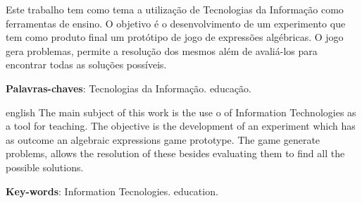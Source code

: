 
\setlength{\absparsep}{18pt} %
\begin{resumo}
 Este trabalho tem como tema a utilização de Tecnologias da Informação como ferramentas de ensino. O objetivo é o desenvolvimento de um  experimento que tem como produto final um protótipo de jogo de expressões algébricas. O jogo gera problemas, permite a resolução dos mesmos além de avaliá-los para encontrar todas as soluções possíveis.

 \textbf{Palavras-chaves}: Tecnologias da Informação. educação.
\end{resumo}

\begin{resumo}[Abstract]
 \begin{otherlanguage*}{english}
   The main subject of this work is the use o of Information Technologies as a tool for teaching. The objective is the development of an experiment which has as outcome an algebraic expressions game prototype. The game generate problems, allows the resolution of these besides evaluating them to find all the possible solutions.

   \vspace{\onelineskip}
 
   \noindent 
   \textbf{Key-words}: Information Tecnologies. education.
 \end{otherlanguage*}
\end{resumo}
